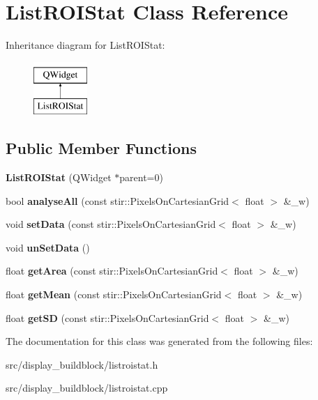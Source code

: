 \hypertarget{classListROIStat}{}\section{List\+R\+O\+I\+Stat Class Reference}
\label{classListROIStat}
Inheritance diagram for List\+R\+O\+I\+Stat\+:\begin{figure}[H]
\begin{center}
\leavevmode
\includegraphics[height=2.000000cm]{classListROIStat}
\end{center}
\end{figure}
\subsection*{Public Member Functions}
\begin{DoxyCompactItemize}
\item 
\mbox{\label{classListROIStat_ab75dfecc931323b639ba32dbf2e557ee}} 
{\bfseries List\+R\+O\+I\+Stat} (Q\+Widget $\ast$parent=0)
\item 
\mbox{\label{classListROIStat_af4dcd07465031df2bde1bfeda358e8d4}} 
bool {\bfseries analyse\+All} (const stir\+::\+Pixels\+On\+Cartesian\+Grid$<$ float $>$ \&\+\_\+w)
\item 
\mbox{\label{classListROIStat_a984e01f7cb3fae2752f89ebdf51523f2}} 
void {\bfseries set\+Data} (const stir\+::\+Pixels\+On\+Cartesian\+Grid$<$ float $>$ \&\+\_\+w)
\item 
\mbox{\label{classListROIStat_a73c43119352ccf1d60a29f4ea79b1601}} 
void {\bfseries un\+Set\+Data} ()
\item 
\mbox{\label{classListROIStat_a3987566eb4dd9b25aaadcd9cbf323049}} 
float {\bfseries get\+Area} (const stir\+::\+Pixels\+On\+Cartesian\+Grid$<$ float $>$ \&\+\_\+w)
\item 
\mbox{\label{classListROIStat_ab293143fbff73460757fe27e59fca768}} 
float {\bfseries get\+Mean} (const stir\+::\+Pixels\+On\+Cartesian\+Grid$<$ float $>$ \&\+\_\+w)
\item 
\mbox{\label{classListROIStat_a2adc70755e4fec8874ec0198dfb9ac55}} 
float {\bfseries get\+SD} (const stir\+::\+Pixels\+On\+Cartesian\+Grid$<$ float $>$ \&\+\_\+w)
\end{DoxyCompactItemize}


The documentation for this class was generated from the following files\+:\begin{DoxyCompactItemize}
\item 
src/display\+\_\+buildblock/listroistat.\+h\item 
src/display\+\_\+buildblock/listroistat.\+cpp\end{DoxyCompactItemize}
